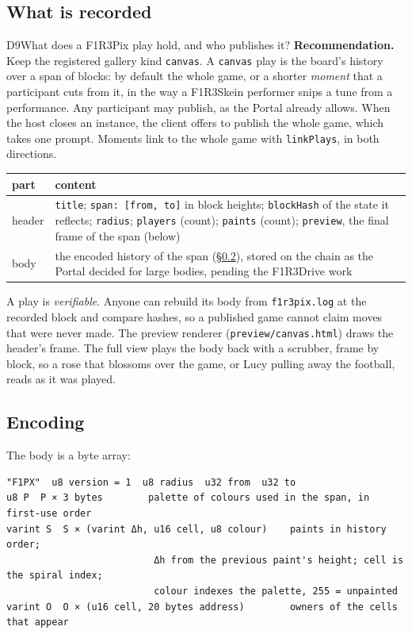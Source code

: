 \documentclass[11pt,a4paper]{article}
\newcommand{\code}[1]{\texttt{#1}}
\begin{document}
\subsection{What is recorded}

\begin{decision}{D9}{What does a F1R3Pix play hold, and who publishes it?}
\textbf{Recommendation.} Keep the registered gallery kind \code{canvas}. A \code{canvas} play is
the board's history over a span of blocks: by default the whole game, or a shorter
\emph{moment} that a participant cuts from it, in the way a F1R3Skein performer snips a tune
from a performance. Any participant may publish, as the Portal already allows. When the host
closes an instance, the client offers to publish the whole game, which takes one prompt.
Moments link to the whole game with \code{linkPlays}, in both directions.
\end{decision}

\begin{center}\small
\begin{tabularx}{\linewidth}{@{}l X@{}}
\toprule
part & content\\
\midrule
header & \code{title}; \code{span: [from, to]} in block heights; \code{blockHash} of the state it reflects; \code{radius}; \code{players} (count); \code{paints} (count); \code{preview}, the final frame of the span (below)\\
body & the encoded history of the span (\S\ref{sec:encoding}), stored on the chain as the Portal decided for large bodies, pending the F1R3Drive work\\
\bottomrule
\end{tabularx}
\end{center}

A play is \emph{verifiable}. Anyone can rebuild its body from \code{f1r3pix.log} at the recorded
block and compare hashes, so a published game cannot claim moves that were never made. The
preview renderer (\code{preview/canvas.html}) draws the header's frame. The full view plays the
body back with a scrubber, frame by block, so a rose that blossoms over the game, or Lucy
pulling away the football, reads as it was played.

\subsection{Encoding}\label{sec:encoding}

The body is a byte array:

\begin{lstlisting}
"F1PX"  u8 version = 1  u8 radius  u32 from  u32 to
u8 P  P × 3 bytes        palette of colours used in the span, in first-use order
varint S  S × (varint Δh, u16 cell, u8 colour)    paints in history order;
                          Δh from the previous paint's height; cell is the spiral index;
                          colour indexes the palette, 255 = unpainted
varint O  O × (u16 cell, 20 bytes address)        owners of the cells that appear
\end{lstlisting}
\end{document}
